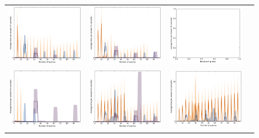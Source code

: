\documentclass{article}
\renewcommand\[{\begin{equation}}
\renewcommand\]{\end{equation}}
\begin{document}
\begin{figure}[b]
\begin{tabular}{cccc}
        \includegraphics[width=12em]{figures/synthetic_4_uniform_sparse_cv5_time} &
        \includegraphics[width=12em]{figures/synthetic_5_uniform_sparse_cv5_time} &
        \includegraphics[width=12em]{figures/synthetic_6_uniform_sparse_cv5_time}
        \\
        \includegraphics[width=12em]{figures/synthetic_3_normal_cv5_time} &
        \includegraphics[width=12em]{figures/synthetic_4_normal_cv5_time} &
        \includegraphics[width=12em]{figures/synthetic_5_normal_cv5_time} &

\end{tabular}
\end{figure}
\end{document}
